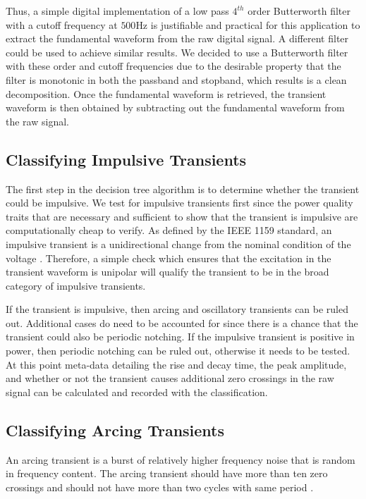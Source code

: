 \documentclass[10pt, conference, compsocconf]{IEEEtran}
\begin{document}
Thus, a simple digital implementation of a low pass $4^{th}$ order Butterworth filter with a cutoff frequency at $500$Hz is justifiable and practical for this application to extract the fundamental waveform from the raw digital signal. A different filter could be used to achieve similar results. We decided to use a Butterworth filter with these order and cutoff frequencies due to the desirable property that the filter is monotonic in both the passband and stopband, which results is a clean decomposition. Once the fundamental waveform is retrieved, the transient waveform is then obtained by subtracting out the fundamental waveform from the raw signal.

\subsection{Classifying Impulsive Transients}

The first step in the decision tree algorithm is to determine whether the transient could be impulsive. We test for impulsive transients first since the power quality traits that are necessary and sufficient to show that the transient is impulsive are computationally cheap to verify. As defined by the IEEE 1159 standard, an impulsive transient is a unidirectional change from the nominal condition of the voltage \cite{IEEE:2018:1159D3}. Therefore, a simple check which ensures that the excitation in the transient waveform is unipolar will qualify the transient to be in the broad category of impulsive transients.

If the transient is impulsive, then arcing and oscillatory transients can be ruled out. Additional cases do need to be accounted for since there is a chance that the transient could also be periodic notching. If the impulsive transient is positive in power, then periodic notching can be ruled out, otherwise it needs to be tested. At this point meta-data detailing the rise and decay time, the peak amplitude, and whether or not the transient causes additional zero crossings in the raw signal can be calculated and recorded with the classification.

\subsection{Classifying Arcing Transients}

An arcing transient is a burst of relatively higher frequency noise that is random in frequency content. The arcing transient should have more than ten zero crossings and should not have more than two cycles with same period \cite{IEEE:2018:1159D3}.
\end{document}
